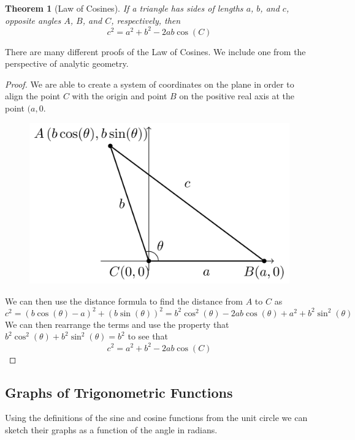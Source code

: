 \documentclass[
]{book}
\newtheorem{theorem}{Theorem}[chapter]
\theoremstyle{definition}
\theoremstyle{definition}
\theoremstyle{definition}
\theoremstyle{remark}
\begin{document}
\begin{theorem}[Law of Cosines]
\protect\hypertarget{thm:unnamed-chunk-240}{}{\label{thm:unnamed-chunk-240} {} }If a triangle has sides of lengths \(a\), \(b\), and \(c\), opposite angles \(A\), \(B\), and \(C\), respectively, then
\[c^2=a^2+b^2 -2ab\cos(C)\]
\end{theorem}

There are many different proofs of the Law of Cosines. We include one from the perspective of analytic geometry.

\begin{proof}

We are able to create a system of coordinates on the plane in order to align the point \(C\) with the origin and point \(B\) on the positive real axis at the point \((a,0\).

\begin{figure}

{\centering \includegraphics[width=0.4\linewidth]{tikz/law-of-cosines} 

}

\end{figure}

We can then use the distance formula to find the distance from \(A\) to \(C\) as
\[c^2=\left(b\cos(\theta)-a\right)^2 + (b\sin(\theta))^2= b^2 \cos^2(\theta)-2ab\cos(\theta) + a^2 + b^2 \sin^2(\theta)\]
We can then rearrange the terms and use the property that \(b^2\cos^2(\theta) + b^2\sin^2(\theta) = b^2\) to see that
\[c^2=a^2+b^2 -2ab\cos(C)\]

\end{proof}

\hypertarget{graphs-of-trigonometric-functions}{%
\subsection{Graphs of Trigonometric Functions}\label{graphs-of-trigonometric-functions}}

Using the definitions of the sine and cosine functions from the unit circle we can sketch their graphs as a function of the angle in radians.
\end{document}
